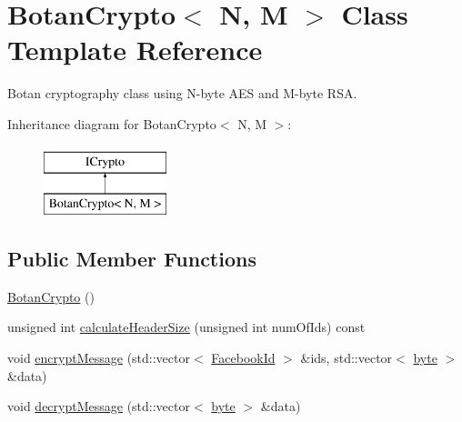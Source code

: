\hypertarget{classefb_1_1BotanCrypto}{
\section{BotanCrypto$<$ N, M $>$ Class Template Reference}
\label{classefb_1_1BotanCrypto}
}


Botan cryptography class using N-\/byte AES and M-\/byte RSA.  


Inheritance diagram for BotanCrypto$<$ N, M $>$:\begin{figure}[H]
\begin{center}
\leavevmode
\includegraphics[height=2.000000cm]{classefb_1_1BotanCrypto}
\end{center}
\end{figure}
\subsection*{Public Member Functions}
\begin{DoxyCompactItemize}
\item 
\hyperlink{classefb_1_1BotanCrypto_a0c0158c6ffe67cd6db789dd6a6c6cc17}{BotanCrypto} ()
\item 
unsigned int \hyperlink{classefb_1_1BotanCrypto_aaaaf0d310c60207d6c545ed3a8b72fcd}{calculateHeaderSize} (unsigned int numOfIds) const 
\item 
void \hyperlink{classefb_1_1BotanCrypto_ace3300e249bf4305ddffeee43c13d844}{encryptMessage} (std::vector$<$ \hyperlink{structefb_1_1FacebookId}{FacebookId} $>$ \&ids, std::vector$<$ \hyperlink{namespaceefb_a0c8186d9b9b7880309c27230bbb5e69d}{byte} $>$ \&data)
\item 
void \hyperlink{classefb_1_1BotanCrypto_acb98871622014be1ac47d2126c04d4de}{decryptMessage} (std::vector$<$ \hyperlink{namespaceefb_a0c8186d9b9b7880309c27230bbb5e69d}{byte} $>$ \&data)
\end{DoxyCompactItemize}
